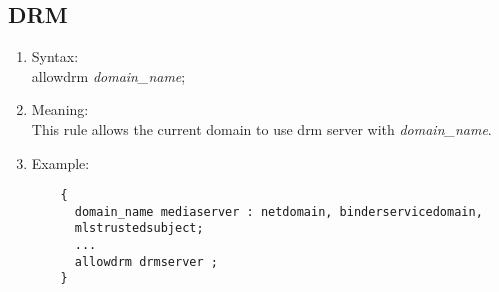 \documentclass{article}
\begin{document}
\subsection{DRM}
\begin{enumerate}
	\item Syntax:\\
	allowdrm {\em domain\_name};
	\item Meaning:\\
	This rule allows the current domain to use drm server with {\em 
	domain\_name}.
	\item Example:\\
	\begin{verbatim}
	{
	  domain_name mediaserver : netdomain, binderservicedomain, 
	  mlstrustedsubject;
	  ...
	  allowdrm drmserver ;
	}
	\end{verbatim}
\end{enumerate}
\end{document}
